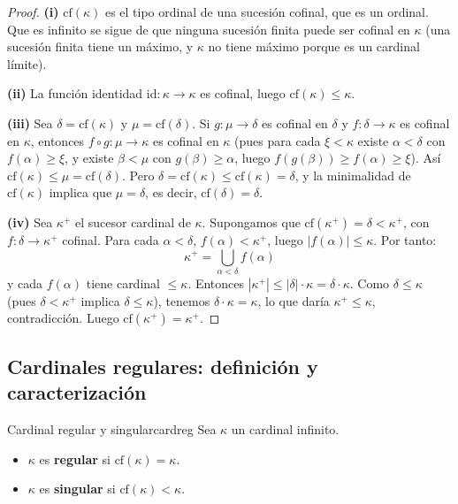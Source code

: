 \begin{proof}
\textbf{(i)} $\mathrm{cf}(\kappa)$ es el tipo ordinal de una sucesión cofinal, que es un ordinal. Que es infinito se sigue de que ninguna sucesión finita puede ser cofinal en $\kappa$ (una sucesión finita tiene un máximo, y $\kappa$ no tiene máximo porque es un cardinal límite).

\textbf{(ii)} La función identidad $\mathrm{id} \colon \kappa \to \kappa$ es cofinal, luego $\mathrm{cf}(\kappa) \leq \kappa$.

\textbf{(iii)} Sea $\delta = \mathrm{cf}(\kappa)$ y $\mu = \mathrm{cf}(\delta)$. Si $g \colon \mu \to \delta$ es cofinal en $\delta$ y $f \colon \delta \to \kappa$ es cofinal en $\kappa$, entonces $f \circ g \colon \mu \to \kappa$ es cofinal en $\kappa$ (pues para cada $\xi < \kappa$ existe $\alpha < \delta$ con $f(\alpha) \geq \xi$, y existe $\beta < \mu$ con $g(\beta) \geq \alpha$, luego $f(g(\beta)) \geq f(\alpha) \geq \xi$). Así $\mathrm{cf}(\kappa) \leq \mu = \mathrm{cf}(\delta)$. Pero $\delta = \mathrm{cf}(\kappa) \leq \mathrm{cf}(\kappa) = \delta$, y la minimalidad de $\mathrm{cf}(\kappa)$ implica que $\mu = \delta$, es decir, $\mathrm{cf}(\delta) = \delta$.

\textbf{(iv)} Sea $\kappa^+$ el sucesor cardinal de $\kappa$. Supongamos que $\mathrm{cf}(\kappa^+) = \delta < \kappa^+$, con $f \colon \delta \to \kappa^+$ cofinal. Para cada $\alpha < \delta$, $f(\alpha) < \kappa^+$, luego $|f(\alpha)| \leq \kappa$. Por tanto:
\[
  \kappa^+ = \bigcup_{\alpha < \delta} f(\alpha)
\]
y cada $f(\alpha)$ tiene cardinal $\leq \kappa$. Entonces $|\kappa^+| \leq |\delta| \cdot \kappa = \delta \cdot \kappa$. Como $\delta \leq \kappa$ (pues $\delta < \kappa^+$ implica $\delta \leq \kappa$), tenemos $\delta \cdot \kappa = \kappa$, lo que daría $\kappa^+ \leq \kappa$, contradicción. Luego $\mathrm{cf}(\kappa^+) = \kappa^+$.
\end{proof}

\subsection{Cardinales regulares: definición y caracterización}

\begin{definicion}{Cardinal regular y singular}{cardreg}
Sea $\kappa$ un cardinal infinito.
\begin{itemize}[leftmargin=2em]
  \item $\kappa$ es \textbf{regular} si $\mathrm{cf}(\kappa) = \kappa$.
  \item $\kappa$ es \textbf{singular} si $\mathrm{cf}(\kappa) < \kappa$.
\end{itemize}
\end{definicion}

